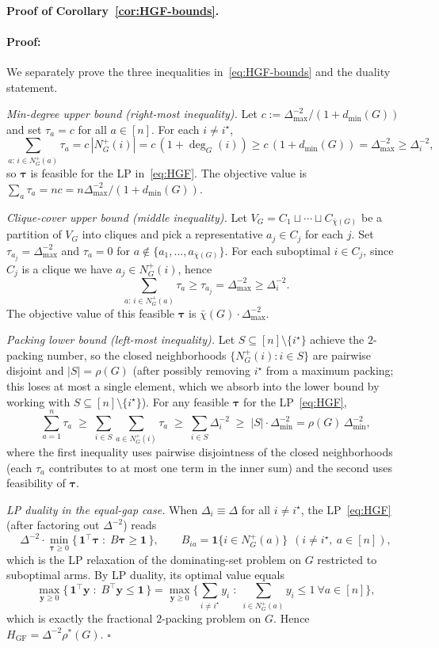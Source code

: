 \documentclass{article}
\newenvironment{proof}{\paragraph{Proof:}}{\hfill$\square$}
\newcommand{\ind}{\mathbf{1}}         %
\begin{document}
\paragraph{Proof of Corollary~\ref{cor:HGF-bounds}.}

\begin{proof}
We separately prove the three inequalities in~\eqref{eq:HGF-bounds} and the duality statement.

\emph{Min-degree upper bound (right-most inequality).}
Let $c:=\Delta_{\max}^{-2}/(1+d_{\min}(G))$ and set $\tau_a=c$ for all $a\in[n]$. For each $i\neq i^\star$,
\[
\sum_{a:\,i\in N_G^+(a)}\tau_a
= c\,|N_G^+(i)|
= c\,(1+\deg_G(i))
\ge c\,(1+d_{\min}(G))
= \Delta_{\max}^{-2}
\ge \Delta_i^{-2},
\]
so $\bm\tau$ is feasible for the LP in~\eqref{eq:HGF}. The objective value is $\sum_a\tau_a = nc = n\Delta_{\max}^{-2}/(1+d_{\min}(G))$.

\emph{Clique-cover upper bound (middle inequality).}
Let $V_G=C_1\sqcup\cdots\sqcup C_{\bar\chi(G)}$ be a partition of $V_G$ into cliques and pick a representative $a_j\in C_j$ for each $j$. Set $\tau_{a_j}=\Delta_{\max}^{-2}$ and $\tau_a=0$ for $a\notin\{a_1,\dots,a_{\bar\chi(G)}\}$. For each suboptimal $i\in C_j$, since $C_j$ is a clique we have $a_j\in N_G^+(i)$, hence
\[
\sum_{a:\,i\in N_G^+(a)}\tau_a
\ge \tau_{a_j}
= \Delta_{\max}^{-2}
\ge \Delta_i^{-2}.
\]
The objective value of this feasible $\bm\tau$ is $\bar\chi(G)\cdot\Delta_{\max}^{-2}$.

\emph{Packing lower bound (left-most inequality).}
Let $S\subseteq[n]\setminus\{i^\star\}$ achieve the $2$-packing number, so the closed neighborhoods $\{N_G^+(i):i\in S\}$ are pairwise disjoint and $|S|=\rho(G)$ (after possibly removing $i^\star$ from a maximum packing; this loses at most a single element, which we absorb into the lower bound by working with $S\subseteq[n]\setminus\{i^\star\}$). For any feasible $\bm\tau$ for the LP~\eqref{eq:HGF},
\[
\sum_{a=1}^n\tau_a
\;\ge\;
\sum_{i\in S}\sum_{a\in N_G^+(i)}\tau_a
\;\ge\;
\sum_{i\in S}\Delta_i^{-2}
\;\ge\;
|S|\cdot\Delta_{\min}^{-2}
=\rho(G)\,\Delta_{\min}^{-2},
\]
where the first inequality uses pairwise disjointness of the closed neighborhoods (each $\tau_a$ contributes to at most one term in the inner sum) and the second uses feasibility of $\bm\tau$.

\emph{LP duality in the equal-gap case.}
When $\Delta_i\equiv\Delta$ for all $i\neq i^\star$, the LP~\eqref{eq:HGF} (after factoring out $\Delta^{-2}$) reads
\[
\Delta^{-2}\cdot\min_{\bm\tau\ge 0}\Big\{\,\bm 1^\top\bm\tau\;:\;B\bm\tau\ge\bm 1\,\Big\},
\qquad B_{ia}=\ind\{i\in N_G^+(a)\}\ \ (i\neq i^\star,\ a\in[n]),
\]
which is the LP relaxation of the dominating-set problem on $G$ restricted to suboptimal arms. By LP duality, its optimal value equals
\[
\max_{\bm y\ge 0}\Big\{\,\bm 1^\top\bm y\;:\; B^\top\bm y\le \bm 1\,\Big\}
=
\max_{\bm y\ge 0}\Big\{\sum_{i\neq i^\star} y_i\;:\;\sum_{i\in N_G^+(a)} y_i\le 1\ \forall a\in[n]\Big\},
\]
which is exactly the fractional $2$-packing problem on $G$. Hence $H_{\mathrm{GF}}=\Delta^{-2}\rho^*(G)$.
\end{proof}
\end{document}
